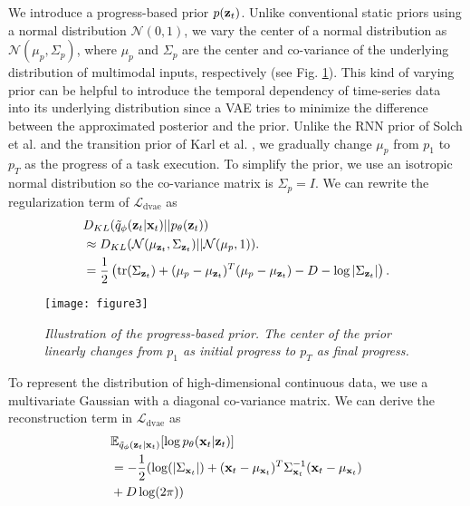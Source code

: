 \documentclass[letterpaper, 10 pt, conference]{ieeeconf}
\newcommand{\vz}{{\bf z}}
\newcommand{\vx}{{\bf x}}
\begin{document}
We introduce a progress-based prior $p(\vz_{t})$. Unlike conventional static priors using a normal distribution $\mathcal{N}(0,1)$, we vary the center of a normal distribution as $\mathcal{N}(\mu_p,\Sigma_p)$, where $\mu_p$ and $\Sigma_p$ are the center and co-variance of the underlying distribution of multimodal inputs, respectively (see Fig. \ref{fig: progress_prior}). This kind of varying prior can be helpful to introduce the temporal dependency of time-series data into its underlying distribution since a VAE tries to minimize the difference between the approximated posterior and the prior. Unlike the RNN prior of Solch et al. \cite{solch2016variational} and the transition prior of Karl et al. \cite{karl2016deep}, we gradually change $\mu_p$ from $p_1$ to $p_T$ as the progress of a task execution. To simplify the prior, we use an isotropic normal distribution so the co-variance matrix is $\Sigma_p=I$. We can rewrite the regularization term of $\mathcal{L_{\mathrm{dvae}}}$ as
\begin{align}
&D_{KL}(\tilde{q}_{\phi}(\vz_{t}|\vx_{t})||p_{\theta}(\vz_{t})) \nonumber \\
&\approx D_{KL}(\mathcal{N}(\mu_{\vz_{t}},\Sigma_{\vz_{t}})||\mathcal{N}(\mu_p,1)). \nonumber \\
&={ \frac{1}{2} } \left( \mathrm{tr}( \Sigma_{\vz_{t}} ) + ( \mu_p - \mu_{\vz_{t}})^T ( \mu_p - \mu_{\vz_{t}} ) 
 - D - \log { | \Sigma_{\vz_{t}} |  } \right).
\end{align}


\begin{figure}[t]
	\centering
	\texttt{[image: figure3]} 
	\caption{\textit{Illustration of the progress-based prior. The center of the prior linearly changes from $p_1$ as initial progress to $p_T$ as final progress.}}
	\label{fig: progress_prior}
    \vspace{-1.5em}
\end{figure}



To represent the distribution of high-dimensional continuous data, we use a multivariate Gaussian with a diagonal co-variance matrix. We can derive the reconstruction term in $\mathcal{L_{\mathrm{dvae}}}$ as
\begin{align}
&\mathbb{E}_{\tilde{q}_{\phi}(\vz_t|\vx_t)}[\log p_{\theta}(\vx_t|\vz_t)] \nonumber \\
&= -\frac{1}{2} ( \log(|\Sigma_{\vx_{t}} |) + (\vx_{t} - \mu_{\vx_{t}})^T \Sigma_{\vx_{t}}^{-1} ({\vx_{t}} - \mu_{\vx_{t}}) \nonumber \\
&+ D \log(2\pi) ) 
\label{eq_lower_bound_new}
\end{align}
\end{document}
